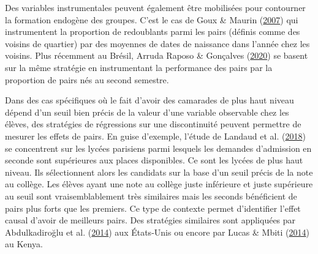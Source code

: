 \documentclass[
]{book}
\begin{document}
\quad Des variables instrumentales peuvent également être mobilisées pour contourner la formation endogène des groupes. C'est le cas de Goux \& Maurin (\protect\hyperlink{ref-GOU:MAU:07}{2007}) qui instrumentent la proportion de redoublants parmi les pairs (définis comme des voisins de quartier) par des moyennes de dates de naissance dans l'année chez les voisins. Plus récemment au Brésil, Arruda Raposo \& Gonçalves (\protect\hyperlink{ref-RAP:GON:20}{2020}) se basent sur la même stratégie en instrumentant la performance des pairs par la proportion de pairs nés au second semestre.

\quad Dans des cas spécifiques où le fait d'avoir des camarades de plus haut niveau dépend d'un seuil bien précis de la valeur d'une variable observable chez les élèves, des stratégies de régressions sur une discontinuité peuvent permettre de mesurer les effets de pairs. En guise d'exemple, l'étude de Landaud et al. (\protect\hyperlink{ref-LAN:eal:18}{2018}) se concentrent sur les lycées parisiens parmi lesquels les demandes d'admission en seconde sont supérieures aux places disponibles. Ce sont les lycées de plus haut niveau. Ils sélectionnent alors les candidats sur la base d'un seuil précis de la note au collège. Les élèves ayant une note au collège juste inférieure et juste supérieure au seuil sont vraisemblablement très similaires mais les seconds bénéficient de pairs plus forts que les premiers. Ce type de contexte permet d'identifier l'effet causal d'avoir de meilleurs pairs. Des stratégies similaires sont appliquées par Abdulkadiroğlu et al. (\protect\hyperlink{ref-ABD:eal:14}{2014}) aux États-Unis ou encore par Lucas \& Mbiti (\protect\hyperlink{ref-LUC:MBI:14}{2014}) au Kenya.
\end{document}
